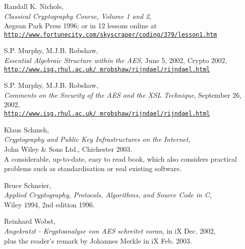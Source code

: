 \begin{thebibliography}{99999}
  
       Randall K. Nichols, \\
       {\em Classical Cryptography Course, Volume 1 and 2}, \\
       Aegean Park Press 1996;
       or in 12 lessons online at \\
       \href{http://www.fortunecity.com/skyscraper/coding/379/lesson1.htm}
       {\texttt{http://www.fortunecity.com/skyscraper/coding/379/lesson1.htm}}

  
        S.P. Murphy, M.J.B. Robshaw, \\
        {\em Essential Algebraic Structure within the AES}, 
        June 5, 2002, Crypto 2002,  \\
        \href{http://www.isg.rhul.ac.uk/\~{}mrobshaw/rijndael/rijndael.html}
        {\texttt{http://www.isg.rhul.ac.uk/~mrobshaw/rijndael/rijndael.html}}

  
        S.P. Murphy, M.J.B. Robshaw, \\
        {\em Comments on the Security of the AES and the XSL Technique}, 
        September 26, 2002, \\
        \href{http://www.isg.rhul.ac.uk/\~{}mrobshaw/rijndael/rijndael.html}
        {\texttt{http://www.isg.rhul.ac.uk/~mrobshaw/rijndael/rijndael.html}}

  
        Klaus Schmeh, \\
        {\em Cryptography and Public Key Infrastructures on the Internet},\\ 
        John Wiley \& Sons Ltd., Chichester 2003. \\
        A considerable, up-to-date, easy to read book, which also 
        considers practical problems such as standardisation or
        real existing software.

  
    Bruce Schneier, \\
    {\em Applied Cryptography, Protocols, Algorithms, and Source Code in C}, \\
    Wiley 1994, 2nd edition 1996.

  
        Reinhard Wobst, \\
        {\em Angekratzt - Kryptoanalyse von AES schreitet voran}, 
        in iX Dec. 2002, \\
        plus the reader's remark by Johannes Merkle in iX Feb. 2003.

\end{thebibliography}


